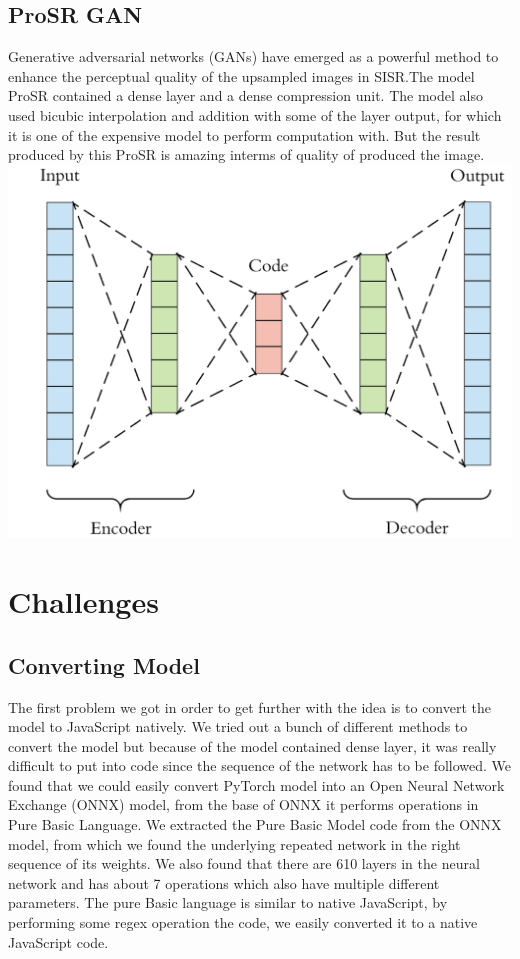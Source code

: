 \documentclass[a4paper,12pt]{article}
\begin{document}
\subsection{ProSR GAN}
Generative adversarial networks (GANs) have emerged as a powerful method to enhance the perceptual quality of the upsampled images in SISR.The model ProSR contained a dense layer and a dense compression unit. The model also used bicubic interpolation and addition with some of the layer output, for which it is one of the expensive model to perform computation with. But the result produced by this ProSR is amazing interms of quality of produced the image.
\cite{ref1}
\\
\includegraphics[width=\linewidth]{autoencoder.png}

\section{Challenges}

\subsection{Converting Model}

The first problem we got in order to get further with the idea is to convert the model to JavaScript natively. We tried out a bunch of different methods to convert the model but because of the model contained dense layer, it was really difficult to put into code since the sequence of the network has to be followed. We found that we could easily convert PyTorch model into an Open Neural Network Exchange (ONNX) model, from the base of ONNX it performs operations in Pure Basic Language. We extracted the Pure Basic Model code from the ONNX model, from which we found the underlying repeated network in the right sequence of its weights. We also found that there are 610 layers in the neural network and has about 7 operations which also have multiple different parameters. The pure Basic language is similar to native JavaScript, by performing some regex operation the code, we easily converted it to a native JavaScript code. 
\end{document}
